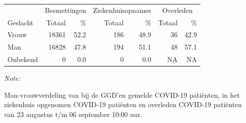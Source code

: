 \documentclass[
  english,
  man,floatsintext]{apa6}
\begin{document}
\begin{table}
\centering\begingroup\fontsize{11}{13}\selectfont

\begin{threeparttable}
\begin{tabular}{lrrrrrr}
\toprule
\multicolumn{1}{c}{ } & \multicolumn{2}{c}{Besmettingen} & \multicolumn{2}{c}{Ziekenhuisopnames} & \multicolumn{2}{c}{Overleden} \\
\cmidrule(l{3pt}r{3pt}){2-3} \cmidrule(l{3pt}r{3pt}){4-5} \cmidrule(l{3pt}r{3pt}){6-7}
Geslacht & Totaal & \% & Totaal & \% & Totaal & \%\\
\midrule
Vrouw & 18361 & 52.2 & 186 & 48.9 & 36 & 42.9\\
Man & 16828 & 47.8 & 194 & 51.1 & 48 & 57.1\\
Onbekend & 0 & 0.0 & 0 & 0.0 & NA & NA\\
\bottomrule
\end{tabular}
\begin{tablenotes}
\item \textit{Note: } 
\item Man-vrouwverdeling van bij de GGD’en gemelde COVID-19 patiënten, in het ziekenhuis opgenomen COVID-19 patiënten en overleden COVID-19 patiënten van 23 augustus t/m 06 september 10:00 uur.
\end{tablenotes}
\end{threeparttable}
\endgroup{}
\end{table}
\newpage
\end{document}
